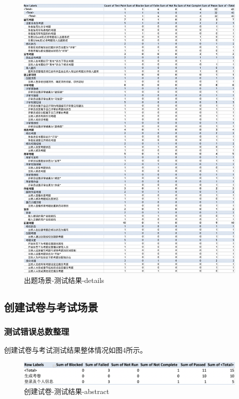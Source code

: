 \documentclass[hyperref, a4paper]{ctexart}
\begin{document}
\begin{figure}
\centering
\includegraphics{screenshoots/PivotTable_Details.png}
\caption{出题场景-测试结果-details}
\end{figure}

\hypertarget{ux521bux5efaux8bd5ux5377ux4e0eux8003ux8bd5ux573aux666f-1}{%
\subsection{创建试卷与考试场景}\label{ux521bux5efaux8bd5ux5377ux4e0eux8003ux8bd5ux573aux666f-1}}

\hypertarget{ux6d4bux8bd5ux9519ux8befux603bux6570ux6574ux7406-1}{%
\subsubsection{测试错误总数整理}\label{ux6d4bux8bd5ux9519ux8befux603bux6570ux6574ux7406-1}}

创建试卷与考试测试结果整体情况如图4所示。

\begin{figure}
\centering
\includegraphics{screenshoots/PivotTable_Abstract_2.png}
\caption{创建试卷-测试结果-abstract}
\end{figure}
\end{document}
